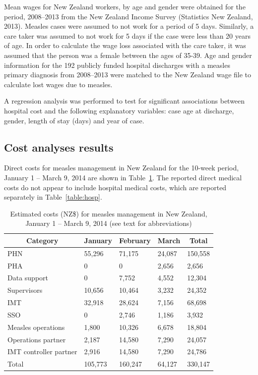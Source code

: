 \documentclass{article}
\begin{document}
{Mean wages for New Zealand workers, by age and gender were obtained for the period, 2008--2013 from the New Zealand Income Survey (Statistics New Zealand, 2013). Measles cases were assumed to not work for a period of 5 days. Similarly, a care taker was assumed to not work for 5 days if the case were less than 20 years of age. In order to calculate the wage loss associated with the care taker, it was assumed that the person was a female between the ages of 35-39. Age and gender information for the 192 publicly funded hospital discharges with a measles primary diagnosis from 2008--2013 were matched to the New Zealand wage file to calculate lost wages due to measles.

A regression analysis was performed to test for significant associations between hospital cost and the following explanatory variables: case age at discharge, gender, length of stay (days) and year of case.

\subsection{Cost analyses results}
Direct costs for measles management in New Zealand for the 10-week period, January 1 -- March 9, 2014 are shown in  Table~\ref{table:direct}. The reported direct medical costs do not appear to include hospital medical costs, which are reported separately in Table~\ref{table:hosp}. 


\begin{table}
\caption{Estimated costs (NZ\$) for measles management in New Zealand, January 1 -- March 9, 2014 (see text for abbreviations)}
\begin{center}
\begin{tabular}{lllll}
\hline\hline
\multicolumn{1}{c}{Category}&\multicolumn{1}{c}{January}&\multicolumn{1}{c}{February}&\multicolumn{1}{c}{March}&\multicolumn{1}{c}{Total}\tabularnewline
\hline
PHN&55,296&71,175&24,087&150,558\tabularnewline
PHA&0&0&2,656&2,656\tabularnewline
Data support&0&7,752&4,552&12,304\tabularnewline
Supervisors&10,656&10,464&3,232&24,352\tabularnewline
IMT&32,918&28,624&7,156&68,698\tabularnewline
SSO&0&2,746&1,186&3,932\tabularnewline
Measles operations&1,800&10,326&6,678&18,804\tabularnewline
Operations partner&2,187&14,580&7,290&24,057\tabularnewline
IMT controller partner&2,916&14,580&7,290&24,786\tabularnewline
Total&105,773&160,247&64,127&330,147\tabularnewline
\hline
\end{tabular}\end{center}\label{table:direct}
\end{table}

}
\end{document}
